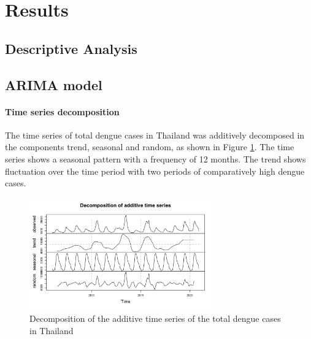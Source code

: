 \section{Results}
	\subsection{Descriptive Analysis}

	\subsection{ARIMA model}
	\paragraph{Time series decomposition}The time series of total dengue cases in Thailand was additively decomposed in the components trend, seasonal and random, as shown in Figure \ref{fig:decomp_ts_dengue}. The time series shows a seasonal pattern with a frequency of 12 months. The trend shows fluctuation over the time period with two periods of comparatively high dengue cases. 
	
	\begin{figure}[htbp] 
		\centering
		\includegraphics[width=0.7\textwidth]{fig/Decomposition_of_add_ts.png}
		\caption{ Decomposition of the additive time series of the total dengue cases in Thailand}
		\label{fig:decomp_ts_dengue}
	\end{figure}
	
